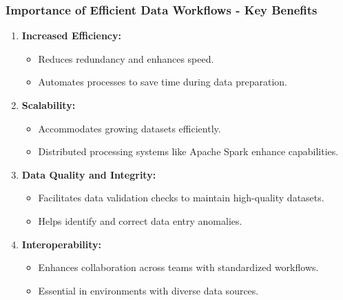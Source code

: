 \documentclass[aspectratio=169]{beamer}
\begin{document}
\begin{frame}[fragile]
    \frametitle{Importance of Efficient Data Workflows - Key Benefits}
    \begin{enumerate}
        \item \textbf{Increased Efficiency:}
        \begin{itemize}
            \item Reduces redundancy and enhances speed.
            \item Automates processes to save time during data preparation.
        \end{itemize}

        \item \textbf{Scalability:}
        \begin{itemize}
            \item Accommodates growing datasets efficiently.
            \item Distributed processing systems like Apache Spark enhance capabilities.
        \end{itemize}

        \item \textbf{Data Quality and Integrity:}
        \begin{itemize}
            \item Facilitates data validation checks to maintain high-quality datasets.
            \item Helps identify and correct data entry anomalies.
        \end{itemize}

        \item \textbf{Interoperability:}
        \begin{itemize}
            \item Enhances collaboration across teams with standardized workflows.
            \item Essential in environments with diverse data sources.
        \end{itemize}
    \end{enumerate}
\end{frame}
\end{document}
